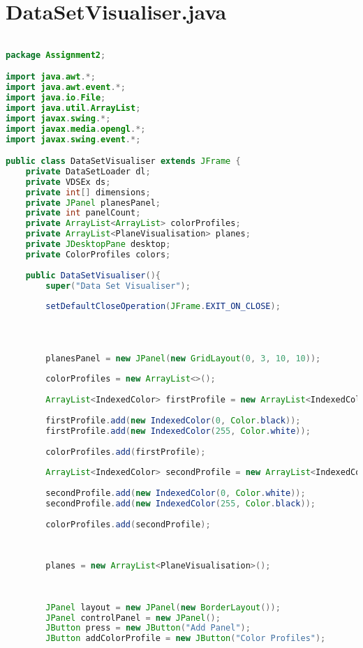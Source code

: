 \documentclass[pdftex,a4paper,10pt,titlepage]{article}
\begin{document}
\section{DataSetVisualiser.java}

\begin{lstlisting}[language=java, breaklines=true]

package Assignment2;

import java.awt.*;
import java.awt.event.*;
import java.io.File;
import java.util.ArrayList;
import javax.swing.*;
import javax.media.opengl.*;
import javax.swing.event.*;

public class DataSetVisualiser extends JFrame {
    private DataSetLoader dl;
    private VDSEx ds;
    private int[] dimensions;
    private JPanel planesPanel;
    private int panelCount;
    private ArrayList<ArrayList> colorProfiles;
    private ArrayList<PlaneVisualisation> planes;
    private JDesktopPane desktop;
    private ColorProfiles colors;
    
    public DataSetVisualiser(){
        super("Data Set Visualiser");
        
        setDefaultCloseOperation(JFrame.EXIT_ON_CLOSE);
        
        
        
        
        planesPanel = new JPanel(new GridLayout(0, 3, 10, 10));
        
        colorProfiles = new ArrayList<>();
        
        ArrayList<IndexedColor> firstProfile = new ArrayList<IndexedColor>();
        
        firstProfile.add(new IndexedColor(0, Color.black));
        firstProfile.add(new IndexedColor(255, Color.white));
        
        colorProfiles.add(firstProfile);
        
        ArrayList<IndexedColor> secondProfile = new ArrayList<IndexedColor>();
        
        secondProfile.add(new IndexedColor(0, Color.white));
        secondProfile.add(new IndexedColor(255, Color.black));
        
        colorProfiles.add(secondProfile);
        
        
        
        planes = new ArrayList<PlaneVisualisation>();
        
        
        
        JPanel layout = new JPanel(new BorderLayout());
        JPanel controlPanel = new JPanel();
        JButton press = new JButton("Add Panel");
        JButton addColorProfile = new JButton("Color Profiles");
        

\end{lstlisting}
\end{document}
